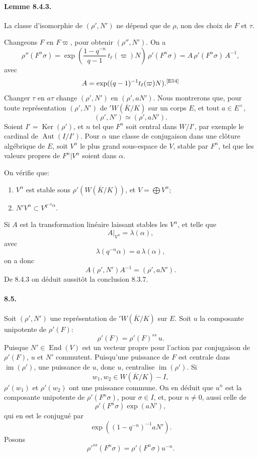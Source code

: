 \documentclass[10pt,letterpaper]{article}
\providecommand{\Ker}{\operatorname{Ker}}
\providecommand{\im}{\operatorname{im}}
\providecommand{\Aut}{\operatorname{Aut}}
\providecommand{\End}{\operatorname{End}}
\providecommand{\im}{\operatorname{im}}
\providecommand{\im}{\operatorname{im}}
\providecommand{\End}{\operatorname{End}}
\providecommand{\Ker}{\operatorname{Ker}}
\newcommand{\auditmark}[1]{\textsuperscript{\normalfont\scriptsize[E#1]}}
\begin{document}
\paragraph{Lemme 8.4.3.} La classe d'isomorphie de \((\rho',N')\) ne dépend que de \(\rho\), non des choix de \(F\) et \(\tau\).

Changeons \(F\) en \(F\varpi\), pour obtenir \((\rho'',N')\). On a
\[
\rho''(F^n\sigma)=
\exp\left(\frac{1-q^{-n}}{q-1}\,t_\ell(\varpi)N\right)\,\rho'(F^n\sigma)
=
A\,\rho'(F^n\sigma)\,A^{-1},
\]
avec
\[
A=\exp((q-1)^{-1}t_\ell(\varpi)N).\auditmark{54}
\]
Changer \(\tau\) en \(a\tau\) change \((\rho',N')\) en \((\rho',aN')\). Nous montrerons que, pour toute représentation \((\rho',N')\) de \({}'W(\overline K/K)\) sur un corps \(E\), et tout \(a\in E^\times\),
\[
(\rho',N')\simeq(\rho',aN').
\]
Soient \(I'=\Ker(\rho')\), et \(n\) tel que \(F^n\) soit central dans \(W/I'\), par exemple le cardinal de \(\Aut(I/I')\). Pour \(\alpha\) une classe de conjugaison dans une clôture algébrique de \(E\), soit \(V^\alpha\) le plus grand sous-espace de \(V\), stable par \(F^n\), tel que les valeurs propres de \(F^n|V^\alpha\) soient dans \(\alpha\).

On vérifie que:
\begin{enumerate}[label=(\alph*)]
\item \(V^\alpha\) est stable sous \(\rho'(W(\overline K/K))\), et \(V=\bigoplus V^\alpha\);
\item \(N' V^\alpha\subset V^{q^{-n}\alpha}\).
\end{enumerate}
Si \(A\) est la transformation linéaire laissant stables les \(V^\alpha\), et telle que
\[
A|_{V^\alpha}=\lambda(\alpha),
\]
avec
\[
\lambda(q^{-n}\alpha)=a\,\lambda(\alpha),
\]
on a donc
\[
A(\rho',N')A^{-1}=(\rho',aN').
\]
De 8.4.3 on déduit aussitôt la conclusion 8.3.7.

\paragraph{8.5.} Soit \((\rho',N')\) une représentation de \({}'W(\overline K/K)\) sur \(E\). Soit \(u\) la composante unipotente de \(\rho'(F)\):
\[
\rho'(F)=\rho'(F)^{ss}\,u.
\]
Puisque \(N'\in\End(V)\) est un vecteur propre pour l'action par conjugaison de \(\rho'(F)\), \(u\) et \(N'\) commutent. Puisqu'une puissance de \(F\) est centrale dans \(\im(\rho')\), une puissance de \(u\), donc \(u\), centralise \(\im(\rho')\). Si
\[
w_1,w_2\in W(\overline K/K)-I,
\]
\(\rho'(w_1)\) et \(\rho'(w_2)\) ont une puissance commune. On en déduit que \(u^n\) est la composante unipotente de \(\rho'(F^n\sigma)\), pour \(\sigma\in I\), et, pour \(n\ne0\), aussi celle de
\[
\rho'(F^n\sigma)\exp(aN'),
\]
qui en est le conjugué par
\[
\exp((1-q^{-n})^{-1}aN').
\]
Posons
\[
\tag{8.5.1}
\rho'^{ss}(F^n\sigma)=\rho'(F^n\sigma)u^{-n}.
\]
\end{document}
